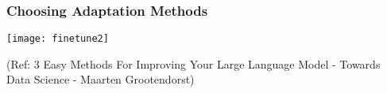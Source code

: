 
\begin{frame}[fragile]\frametitle{Choosing Adaptation Methods}


		\begin{center}
		\texttt{[image: finetune2]}
		\end{center}

{\tiny (Ref: 3 Easy Methods For Improving Your Large Language Model - Towards Data Science - Maarten Grootendorst)}

\end{frame}

